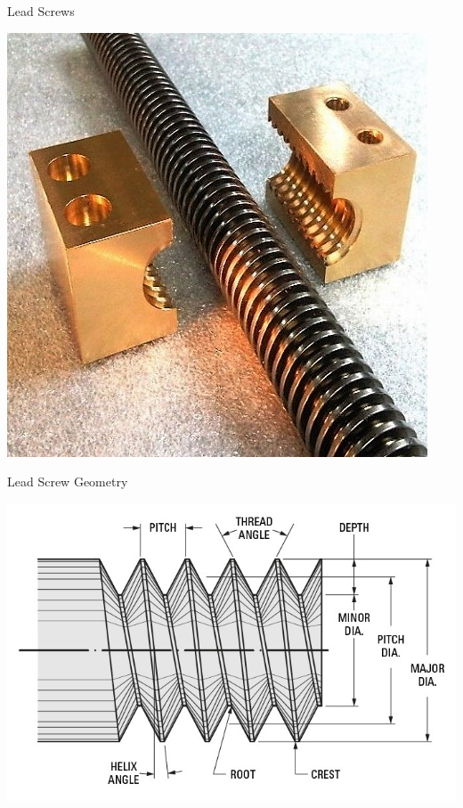 \documentclass[10pt, svgnames]{beamer}
\begin{document}
\begin{frame}[label={sec:orgca56c29}]{Lead Screws}
\begin{center}
\includegraphics[height=0.9\textheight]{./pictures/lead-screw.jpg}
\end{center}
\end{frame}

\begin{frame}[label={sec:org2ac5614}]{Lead Screw Geometry}
\begin{center}
\includegraphics[width=.9\linewidth]{pictures/screw-thread.jpg}
\end{center}
\end{frame}
\end{document}
